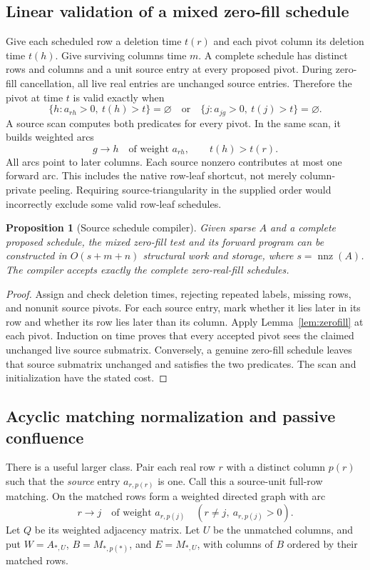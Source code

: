 \documentclass[11pt,letterpaper]{article}
\newtheorem{proposition}[theorem]{Proposition}
\theoremstyle{definition}
\newcommand{\nnz}{\operatorname{nnz}}
\begin{document}
\subsection{Linear validation of a mixed zero-fill schedule}
Give each scheduled row a deletion time $t(r)$ and each pivot column its deletion time $t(h)$. Give surviving columns time $m$. A complete schedule has distinct rows and columns and a unit source entry at every proposed pivot. During zero-fill cancellation, all live real entries are unchanged source entries. Therefore the pivot at time $t$ is valid exactly when
\[
 \bigl\{h:a_{rh}>0,\ t(h)>t\bigr\}=\varnothing
 \quad\text{or}\quad
 \bigl\{j:a_{jg}>0,\ t(j)>t\bigr\}=\varnothing.
\]
A source scan computes both predicates for every pivot. In the same scan, it builds weighted arcs
\[
 g\longrightarrow h\quad\text{of weight }a_{rh},\qquad t(h)>t(r).
\]
All arcs point to later columns. Each source nonzero contributes at most one forward arc. This includes the native row-leaf shortcut, not merely column-private peeling. Requiring source-triangularity in the supplied order would incorrectly exclude some valid row-leaf schedules.

\begin{proposition}[Source schedule compiler]\label{prop:compiler}
Given sparse $A$ and a complete proposed schedule, the mixed zero-fill test and its forward program can be constructed in $O(s+m+n)$ structural work and storage, where $s=\nnz(A)$. The compiler accepts exactly the complete zero-real-fill schedules.
\end{proposition}
\begin{proof}
Assign and check deletion times, rejecting repeated labels, missing rows, and nonunit source pivots. For each source entry, mark whether it lies later in its row and whether its row lies later than its column. Apply Lemma~\ref{lem:zerofill} at each pivot. Induction on time proves that every accepted pivot sees the claimed unchanged live source submatrix. Conversely, a genuine zero-fill schedule leaves that source submatrix unchanged and satisfies the two predicates. The scan and initialization have the stated cost.
\end{proof}

\subsection{Acyclic matching normalization and passive confluence}
There is a useful larger class. Pair each real row $r$ with a distinct column $p(r)$ such that the \emph{source} entry $a_{r,p(r)}$ is one. Call this a source-unit full-row matching. On the matched rows form a weighted directed graph with arc
\[
 r\longrightarrow j\quad\text{of weight }a_{r,p(j)}
 \quad (r\ne j,\ a_{r,p(j)}>0).
\]
Let $Q$ be its weighted adjacency matrix. Let $U$ be the unmatched columns, and put $W=A_{*,U}$, $B=M_{*,p(*)}$, and $E=M_{*,U}$, with columns of $B$ ordered by their matched rows.
\end{document}
